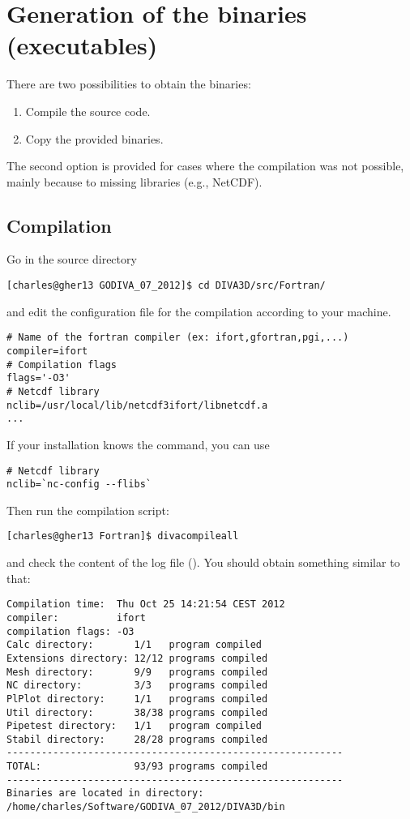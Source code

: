 \section{Generation of the binaries (executables)}

There are two possibilities to obtain the binaries: 
\begin{enumerate}
\item Compile the source code.
\item Copy the provided binaries.
\end{enumerate}
The second option is provided for cases where the compilation was not possible, mainly because to missing libraries (e.g., NetCDF). 

\subsection{Compilation\label{sec:compilation}}

Go in the source directory 
\begin{lstlisting}[style=Bash]
[charles@gher13 GODIVA_07_2012]$ cd DIVA3D/src/Fortran/
\end{lstlisting}
and edit the configuration file  for the compilation  according to your machine. 

\begin{verbatim}
# Name of the fortran compiler (ex: ifort,gfortran,pgi,...)
compiler=ifort
# Compilation flags
flags='-O3'
# Netcdf library
nclib=/usr/local/lib/netcdf3ifort/libnetcdf.a
...
\end{verbatim}

If your installation knows the  command, you can use 
\begin{verbatim}
# Netcdf library
nclib=`nc-config --flibs`
\end{verbatim}

Then run the compilation script: 
\begin{lstlisting}[style=Bash]
[charles@gher13 Fortran]$ divacompileall
\end{lstlisting}
and check the content of the log file (). You should obtain something similar to that:
\begin{verbatim}
Compilation time:  Thu Oct 25 14:21:54 CEST 2012
compiler:          ifort
compilation flags: -O3
Calc directory:       1/1   program compiled
Extensions directory: 12/12 programs compiled
Mesh directory:       9/9   programs compiled
NC directory:         3/3   programs compiled
PlPlot directory:     1/1   programs compiled
Util directory:       38/38 programs compiled
Pipetest directory:   1/1   program compiled
Stabil directory:     28/28 programs compiled
----------------------------------------------------------
TOTAL:                93/93 programs compiled
----------------------------------------------------------
Binaries are located in directory:
/home/charles/Software/GODIVA_07_2012/DIVA3D/bin
\end{verbatim}

